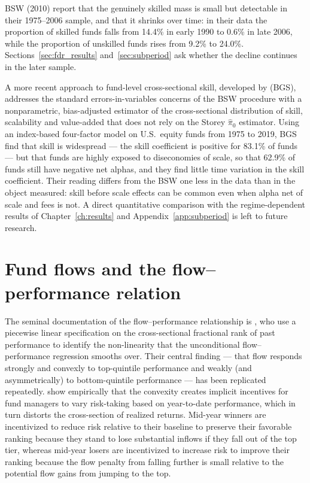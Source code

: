 \documentclass[12pt, oneside]{report}
\begin{document}
BSW (2010) report that the genuinely skilled mass is small but
detectable in their 1975--2006 sample, and that it shrinks over time: in
their data the proportion of skilled funds falls from 14.4\% in early 1990 to
0.6\% in late 2006, while the proportion of unskilled funds rises from 9.2\% to
24.0\%. Sections~\ref{sec:fdr_results} and~\ref{sec:subperiod} ask
whether the decline continues in the later sample.

A more recent approach to fund-level cross-sectional skill, developed by
\textcite{BarrasGagliardiniScaillet2022} (BGS), addresses the standard
errors-in-variables concerns of the BSW procedure with a nonparametric,
bias-adjusted estimator of the cross-sectional distribution of skill,
scalability and value-added that does not rely on the Storey
$\hat{\pi}_0$ estimator. Using an index-based four-factor model on U.S.\
equity funds from 1975 to 2019, BGS find that skill is widespread
--- the skill coefficient is positive for 83.1\% of funds --- but that
funds are highly exposed to diseconomies of scale, so that 62.9\% of
funds still have negative net alphas, and they find little time
variation in the skill coefficient. Their reading differs from the BSW
one less in the data than in the object measured: skill before scale
effects can be common even when alpha net of scale and fees is not.
A direct quantitative comparison with the regime-dependent results of
Chapter~\ref{ch:results} and Appendix~\ref{app:subperiod} is left to future research.

\section{Fund flows and the flow--performance relation}
\label{sec:flow_perf_lit}

\noindent The seminal documentation of the flow--performance relationship
is \textcite{SirriTufano1998}, who use a piecewise linear specification on
the cross-sectional fractional rank of past performance to identify the
non-linearity that the unconditional flow--performance regression smooths
over. Their central finding --- that flow responds strongly and convexly
to top-quintile performance and weakly (and asymmetrically) to
bottom-quintile performance --- has been replicated repeatedly. \textcite{ChevalierEllison1997}
show empirically that the convexity creates implicit
incentives for fund managers to vary risk-taking based on year-to-date
performance, which in turn distorts the cross-section of realized returns. Mid-year winners are incentivized to reduce risk relative to their baseline to preserve their favorable ranking because they stand to lose substantial inflows if they fall out of the top tier, whereas mid-year losers are incentivized to increase risk to improve their ranking because the flow penalty from falling further is small relative to the potential flow gains from jumping to the top.
\end{document}
